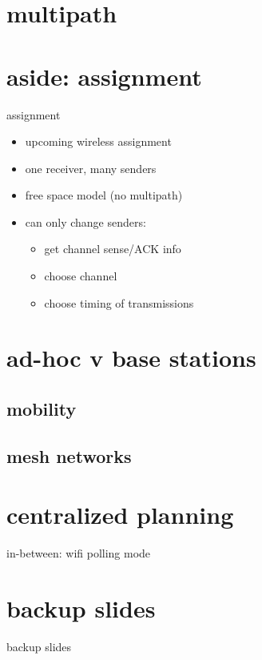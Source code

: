 \section{multipath}



\section{aside: assignment}
\begin{frame}{assignment}
    \begin{itemize}
    \item upcoming wireless assignment
    \item one receiver, many senders
    \item free space model (no multipath)
    \item can only change senders:
        \begin{itemize}
        \item get channel sense/ACK info
        \item choose channel
        \item choose timing of transmissions
        \end{itemize}
    \end{itemize}
\end{frame}

\section{ad-hoc v base stations}


\subsection{mobility}


\subsection{mesh networks}


\section{centralized planning}


\begin{frame}{in-between: wifi polling mode}
\end{frame}



\section{backup slides}
\begin{frame}{backup slides}
\end{frame}


